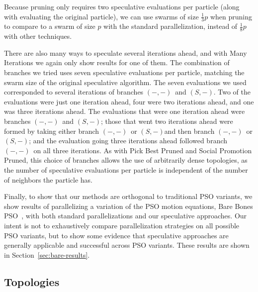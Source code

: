 \documentclass[smallcondensed]{svjour3}
\renewcommand{\sec}[1]{Section~\ref{sec:#1}}
\providecommand{\casexn}{\ensuremath{(S,-)}}
\providecommand{\casepn}{\ensuremath{(-,-)}}
\begin{document}
Because pruning only requires two speculative evaluations per particle (along
with evaluating the original particle), we can use swarms of size
$\frac{1}{3}p$ when pruning to compare to a swarm of size $p$ with the standard
parallelization, instead of $\frac{1}{8}p$ with other techniques.

There are also many ways to speculate several iterations ahead, and with Many
Iterations we again only show results for one of them.  The combination of
branches we tried uses seven speculative evaluations per particle, matching the
swarm size of the original speculative algorithm.  The seven evaluations we
used corresponded to several iterations of branches \casepn\ and \casexn.  Two
of the evaluations were just one iteration ahead, four were two iterations
ahead, and one was three iterations ahead.  The evaluations that were one
iteration ahead were branches \casepn\ and \casexn; those that went two
iterations ahead were formed by taking either branch \casepn\ or \casexn and
then branch \casepn\ or \casexn; and the evaluation going three iterations
ahead followed branch \casepn\ on all three iterations.  As with Pick Best
Pruned and Social Promotion Pruned, this choice of branches allows the use of
arbitrarily dense topologies, as the number of speculative evaluations per
particle is independent of the number of neighbors the particle has.

Finally, to show that our methods are orthogonal to traditional PSO variants,
we show results of parallelizing a variation of the PSO motion equations, Bare
Bones PSO~\citep{kennedy-2003-bare-bones-pso}, with both standard
parallelizations and our speculative approaches.  Our intent is not to
exhaustively compare parallelization strategies on all possible PSO variants,
but to show some evidence that speculative approaches are generally applicable
and successful across PSO variants.  These results are shown in
\sec{bare-results}.

\subsection{Topologies}
\end{document}
